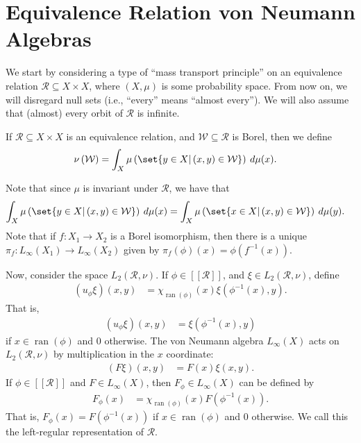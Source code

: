 \documentclass[10pt]{mypackage}
\begin{document}
\section{Equivalence Relation von Neumann Algebras}%
We start by considering a type of ``mass transport principle'' on an equivalence relation $\mathcal{R}\subseteq X\times X$, where $\left( X,\mu \right)$ is some probability space. From now on, we will disregard null sets (i.e., ``every'' means ``almost every''). We will also assume that (almost) every orbit of $\mathcal{R}$ is infinite.
\begin{definition}
  If $\mathcal{R}\subseteq X\times X$ is an equivalence relation, and $\mathcal{W}\subseteq \mathcal{R}$ is Borel, then we define
  \begin{align*}
    \nu\left( \mathcal{W} \right) &= \int_{X}^{} \mu\left( \set{y\in X | \left( x,y \right)\in \mathcal{W}} \right)\:d\mu(x).
  \end{align*}
\end{definition}
Note that since $\mu$ is invariant under $\mathcal{R}$, we have that
\begin{align*}
  \int_{X}^{} \mu\left( \set{y\in X | \left( x,y \right)\in \mathcal{W}} \right)\:d\mu(x) &= \int_{X}^{} \mu\left( \set{x\in X | \left( x,y \right)\in \mathcal{W}} \right)\:d\mu(y).
\end{align*}
Note that if $f\colon X_1\rightarrow X_2$ is a Borel isomorphism, then there is a unique $\pi_{f}\colon L_{\infty}\left( X_1 \right)\rightarrow L_{\infty}\left( X_2 \right)$ given by $\pi_{f}\left( \phi \right)\left( x \right) = \phi\left( f^{-1}(x) \right)$.

Now, consider the space $L_2\left( \mathcal{R},\nu \right)$. If $\phi\in \left[ \left[ \mathcal{R} \right] \right]$, and $\xi\in L_2\left( \mathcal{R},\nu \right)$, define
\begin{align*}
  \left( u_{\phi}\xi \right)\left( x,y \right) &= \chi_{\operatorname{ran}\left( \phi \right)}(x)\xi\left( \phi^{-1}\left( x \right),y \right).
\end{align*}
That is,
\begin{align*}
  \left( u_{\phi}\xi \right)\left( x,y \right) &= \xi\left( \phi^{-1}(x),y \right)
\end{align*}
if $x\in \operatorname{ran}\left( \phi \right)$ and $0$ otherwise. The von Neumann algebra $L_{\infty}(X)$ acts on $L_2\left( \mathcal{R},\nu \right)$ by multiplication in the $x$ coordinate:
\begin{align*}
  \left( F\xi \right)\left( x,y \right) &= F\left( x \right)\xi\left( x,y \right).
\end{align*}
If $\phi\in \left[ \left[ \mathcal{R} \right] \right]$ and $F\in L_{\infty}\left( X \right)$, then $F_{\phi}\in L_{\infty}\left( X \right)$ can be defined by
\begin{align*}
  F_{\phi}(x) &= \chi_{\operatorname{ran}\left( \phi \right)}(x)F\left( \phi^{-1}\left( x \right) \right).
\end{align*}
That is, $F_{\phi}(x) = F\left( \phi^{-1}\left( x \right) \right)$ if $x\in \operatorname{ran}\left( \phi \right)$ and $0$ otherwise. We call this the left-regular representation of $\mathcal{R}$.
\end{document}
